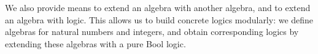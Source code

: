 \documentclass[11pt,a4paper]{article}
\begin{document}
We also provide means to extend an algebra with another algebra,
and to extend an algebra with logic.
This allows us to build concrete logics modularly:
we define algebras for natural numbers and
integers, and obtain corresponding logics by extending these algebras
with a pure Bool logic.








\end{document}
